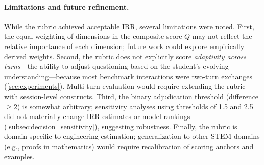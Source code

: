\paragraph{Limitations and future refinement.} While the rubric achieved acceptable IRR, several limitations were noted. First, the equal weighting of dimensions in the composite score $Q$ may not reflect the relative importance of each dimension; future work could explore empirically derived weights. Second, the rubric does not explicitly score \textit{adaptivity across turns}—the ability to adjust questioning based on the student's evolving understanding—because most benchmark interactions were two-turn exchanges (\cref{sec:experiments}). Multi-turn evaluation would require extending the rubric with session-level constructs. Third, the binary adjudication threshold (difference $\geq 2$) is somewhat arbitrary; sensitivity analyses using thresholds of 1.5 and 2.5 did not materially change IRR estimates or model rankings (\cref{subsec:decision_sensitivity}), suggesting robustness. Finally, the rubric is domain-specific to engineering estimation; generalization to other STEM domains (e.g., proofs in mathematics) would require recalibration of scoring anchors and examples.
